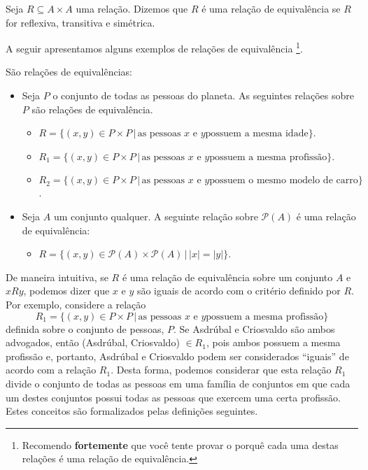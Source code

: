 \begin{Definition}
Seja $R \subseteq A \times A$ uma relação. Dizemos que $R$ é uma
relação de equivalência se $R$ for reflexiva, transitiva e simétrica.
\end{Definition}
A seguir apresentamos alguns exemplos de relações de equivalência
\footnote{Recomendo \textbf{fortemente} que você tente provar o porquê
cada uma destas relações é uma relação de equivalência.}.
\begin{Example}
São relações de equivalências:
\begin{itemize}
  \item Seja $P$ o conjunto de todas as pessoas do planeta. As
    seguintes relações sobre $P$ são relações de equivalência.
  \begin{itemize}
    \item $R=\{(x,y)\in P \times P\,|\,\text{as pessoas $x$ e $y$
        possuem a mesma idade}\}$.
    \item $R_1=\{(x,y)\in P \times P\,|\,\text{as pessoas $x$ e $y$
        possuem a mesma profissão}\}$.
    \item $R_2=\{(x,y)\in P \times P\,|\,\text{as pessoas $x$ e $y$
        possuem o mesmo modelo de carro}\}$.
  \end{itemize}
  \item Seja $A$ um conjunto qualquer. A seguinte relação sobre
    $\mathcal{P}(A)$ é uma relação de equivalência:
  \begin{itemize}
    \item $R = \{(x,y)\in \mathcal{P}(A)\times \mathcal{P}(A)\,|\, |x|
      = |y|\}$.
  \end{itemize}
\end{itemize}
\end{Example}
 De maneira intuitiva, se $R$ é uma relação de equivalência sobre um
 conjunto $A$ e $xRy$, podemos dizer que $x$ e $y$ são iguais de
 acordo com o critério definido por $R$. Por exemplo, considere a
 relação
    \[R_1=\{(x,y)\in P \times P\,|\,\text{as pessoas $x$ e $y$
        possuem a mesma profissão}\}\]
definida sobre o conjunto de pessoas, $P$. Se Asdrúbal e Criosvaldo
são ambos advogados, então (Asdrúbal, Criosvaldo) $\in R_1$, pois
ambos possuem a mesma profissão e, portanto, Asdrúbal e Criosvaldo
podem ser considerados ``iguais'' de acordo com a relação $R_1$.
Desta forma, podemos considerar que esta relação $R_1$ divide o
conjunto de todas as pessoas em uma família de conjuntos em que cada
um destes conjuntos possui todas as pessoas que exercem uma certa
profissão. Estes conceitos são formalizados pelas definições
seguintes.

